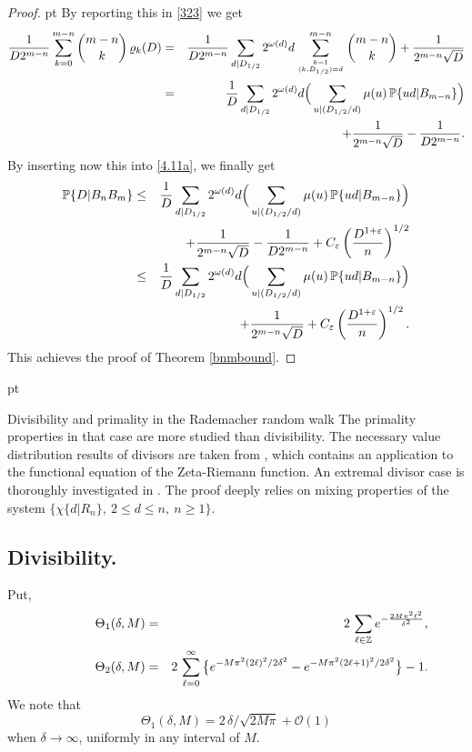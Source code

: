 \documentclass[11pt,draft,reqno]{amsart}
\makeatletter
\def\section{\@startsection{section}{1}%
     \z@{.7\linespacing\@plus\linespacing}{.5\linespacing}%
     {\bfseries%
     \centering
     }}
\theoremstyle{definition}
\theoremstyle{remarks}
\numberwithin{equation}{section}
\def \d{{\delta}}
\def \e{{\varepsilon}}
\def \o{{\omega}}
\def \m{{\mu}}
\def \qq{{\qquad}}
\def\P{{\mathcal P}}
\def\P{{\mathbb P}}
\def\Z{{\mathbb Z}}
\makeatother
\begin{document}
\begin{proof}
 pt
By reporting this in \eqref{323} we get
\begin{eqnarray}\label{323a} 
 {1\over D2^{ m-n }  } \sum_{k=0}^{m-n}  {{m-n}\choose {k}} \, \varrho_k(D) 
 & =  & {1  \over D 2^{  m-n }}\sum_{d| D_{1/2}} 2^{\o (d)}d
 \sum_{k=1\atop (k, D_{1/2})=d}^{m-n}   {{m-n}\choose {k}}  +{1\over 2^{  m-n }\sqrt D }
\cr & =  &  {1  \over D }\sum_{d| D_{1/2} } 2^{\o (d)}d
 \Big(\sum_{u|  (D_{1/2}/d )}\m(u)\, \P\{ud|B_{m-n}\}\Big)
 \cr & &  +{1\over 2^{  m-n }\sqrt D }-{1  \over  D2^{  m-n }} 
   .\end{eqnarray}
By inserting now this into  \eqref{4.11a}, we finally get
\begin{eqnarray}\label{4.11b}  \P \{ D|B_nB_m \} 
&\le &{1  \over D }\sum_{d| D_{1/2} } 2^{\o (d)}d
 \Big(\sum_{u|  (D_{1/2}/d )}\m(u)\, \P\{ud|B_{m-n}\}\Big)
\cr &  &   +{1\over 2^{  m-n }\sqrt D }-{1  \over D 2^{  m-n }}+C_\e
\left({     D  ^{1 + \e}\over   n }\right)^{1/2 }
\cr &\le &{1  \over D }\sum_{d| D_{1/2} } 2^{\o (d)}d
 \Big(\sum_{u|  (D_{1/2}/d )}\m(u)\, \P\{ud|B_{m-n}\}\Big)
\cr &  &   +{1\over 2^{  m-n }\sqrt D } +C_\e
\left({     D  ^{1 + \e}\over   n }\right)^{1/2 }. 
\end{eqnarray} 
This achieves the proof of Theorem \ref{bnmbound}.
\end{proof}

 pt

 
 
 
 
 
 

\section{Divisibility and primality in the Rademacher random walk}\label{s8}
The primality properties in that case  are more studied than divisibility. The necessary value distribution results  of divisors     are taken from  \cite{W7a}, which contains an application to the functional equation of the
 Zeta-Riemann function. An extremal divisor case is thoroughly investigated in \cite{W6}. The proof deeply relies on mixing properties of the system $\big\{ \chi\{d|R_n\},    \    2\le d\le n,\ n\ge 1\big\}$.
 
 \subsection{Divisibility.}Put, 
\begin{eqnarray}\label{radem(2.7)}\qq \qq  
\Theta_1(\d,M) & =& 2\ \displaystyle{\sum_{\ell\in \Z} e^{-{2M\pi^2\ell^2\over \d^2}},} \cr   
\Theta_2(\d,M)&=&2\ \displaystyle{\sum_{\ell=0}^\infty \big\{e^{-{ M\pi^2(2\ell )^2/ 2\d^2}}-e^{-{
M\pi^2(2\ell+1)^2/ 2\d^2}}\big\}-1.}
 \end{eqnarray}
We note that
\begin{equation}\Theta_1(\d,M)=2\,\d /\sqrt{  {2M\pi } } +\mathcal O(1)
\end{equation}
when $\d\to \infty$, uniformly in any interval of   $M$.
\end{document}
